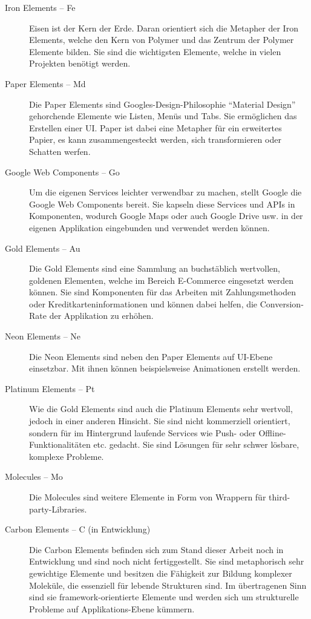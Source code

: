 \begin{description}
  \item[Iron Elements -- Fe] Eisen ist der Kern der Erde. Daran orientiert sich die Metapher der Iron Elements, welche den Kern von Polymer und das Zentrum der Polymer Elemente bilden. Sie sind die wichtigsten Elemente, welche in vielen Projekten benötigt werden.
  \item[Paper Elements -- Md] Die Paper Elements sind Googles-Design-Philosophie ``Material Design'' gehorchende Elemente wie Listen, Menüs und Tabs. Sie ermöglichen das Erstellen einer \ac{UI}. Paper ist dabei eine Metapher für ein erweitertes Papier, es kann zusammengesteckt werden, sich transformieren oder Schatten werfen.
  \item[Google Web Components -- Go] Um die eigenen Services leichter verwendbar zu machen, stellt Google die Google Web Components bereit. Sie kapseln diese Services und \ac{API}s in Komponenten, wodurch Google Maps oder auch Google Drive usw. in der eigenen Applikation eingebunden und verwendet werden können.
  \item[Gold Elements -- Au] Die Gold Elements sind eine Sammlung an buchstäblich wertvollen, goldenen Elementen, welche im Bereich E-Commerce eingesetzt werden können. Sie sind Komponenten für das Arbeiten mit Zahlungsmethoden oder Kreditkarteninformationen und können dabei helfen, die Conversion-Rate der Applikation zu erhöhen.
  \item[Neon Elements -- Ne] Die Neon Elements sind neben den Paper Elements auf \ac{UI}-Ebene einsetzbar. Mit ihnen können beispielsweise Animationen erstellt werden.
  \item[Platinum Elements -- Pt] Wie die Gold Elements sind auch die Platinum Elements sehr wertvoll, jedoch in einer anderen Hinsicht. Sie sind nicht kommerziell orientiert, sondern für im Hintergrund laufende Services wie Push- oder Offline-Funk\-tio\-na\-li\-tä\-ten etc. gedacht. Sie sind Lösungen für sehr schwer lösbare, komplexe Probleme.
  \item[Molecules -- Mo] Die Molecules sind weitere Elemente in Form von Wrappern für third-party-Lib\-rar\-ies.
  \item[Carbon Elements -- C (in Entwicklung)] Die Carbon Elements befinden sich zum Stand dieser Arbeit noch in Entwicklung und sind noch nicht fertiggestellt. Sie sind metaphorisch sehr gewichtige Elemente und besitzen die Fähigkeit zur Bildung komplexer Moleküle, die essenziell für lebende Strukturen sind. Im übertragenen Sinn sind sie framework-orientierte Elemente und werden sich um strukturelle Probleme auf Applikations-Ebene kümmern.
\end{description}


